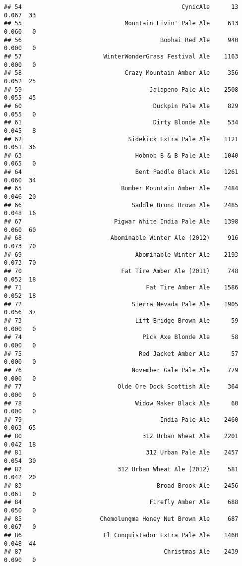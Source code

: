 \documentclass[
]{article}
\begin{document}
\begin{verbatim}
## 54                                             CynicAle      13 0.067  33
## 55                             Mountain Livin' Pale Ale     613 0.060   0
## 56                                       Boohai Red Ale     940 0.000   0
## 57                       WinterWonderGrass Festival Ale    1163 0.000   0
## 58                             Crazy Mountain Amber Ale     356 0.052  25
## 59                                    Jalapeno Pale Ale    2508 0.055  45
## 60                                     Duckpin Pale Ale     829 0.055   0
## 61                                     Dirty Blonde Ale     534 0.045   8
## 62                              Sidekick Extra Pale Ale    1121 0.051  36
## 63                                Hobnob B & B Pale Ale    1040 0.065   0
## 64                                Bent Paddle Black Ale    1261 0.060  34
## 65                            Bomber Mountain Amber Ale    2484 0.046  20
## 66                               Saddle Bronc Brown Ale    2485 0.048  16
## 67                          Pigwar White India Pale Ale    1398 0.060  60
## 68                         Abominable Winter Ale (2012)     916 0.073  70
## 69                                Abominable Winter Ale    2193 0.073  70
## 70                            Fat Tire Amber Ale (2011)     748 0.052  18
## 71                                   Fat Tire Amber Ale    1586 0.052  18
## 72                               Sierra Nevada Pale Ale    1905 0.056  37
## 73                                Lift Bridge Brown Ale      59 0.000   0
## 74                                  Pick Axe Blonde Ale      58 0.000   0
## 75                                 Red Jacket Amber Ale      57 0.000   0
## 76                               November Gale Pale Ale     779 0.000   0
## 77                           Olde Ore Dock Scottish Ale     364 0.000   0
## 78                                Widow Maker Black Ale      60 0.000   0
## 79                                       India Pale Ale    2460 0.063  65
## 80                                  312 Urban Wheat Ale    2201 0.042  18
## 81                                   312 Urban Pale Ale    2457 0.054  30
## 82                           312 Urban Wheat Ale (2012)     581 0.042  20
## 83                                      Broad Brook Ale    2456 0.061   0
## 84                                    Firefly Amber Ale     688 0.050   0
## 85                      Chomolungma Honey Nut Brown Ale     687 0.067   0
## 86                       El Conquistador Extra Pale Ale    1460 0.048  44
## 87                                        Christmas Ale    2439 0.090   0

\end{verbatim}
\end{document}

